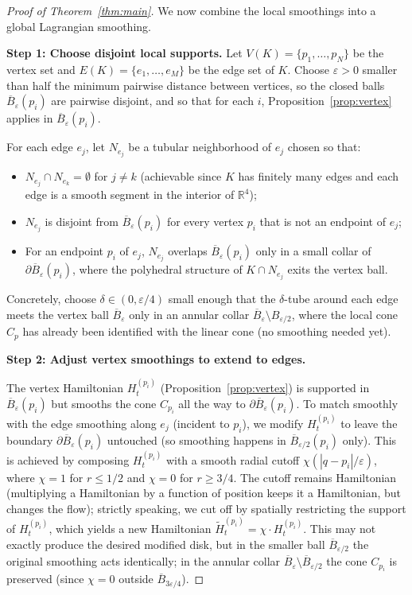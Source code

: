 \documentclass[12pt]{article}
\theoremstyle{definition}
\begin{document}
\begin{proof}[Proof of Theorem~\ref{thm:main}]
We now combine the local smoothings into a global Lagrangian smoothing.

\smallskip\noindent\textbf{Step 1: Choose disjoint local supports.}
Let $V(K)=\{p_1,\dots,p_N\}$ be the vertex set and $E(K)=\{e_1,\dots,e_M\}$ be the edge set of $K$. Choose $\varepsilon>0$ smaller than half the minimum pairwise distance between vertices, so the closed balls $\overline{B}_\varepsilon(p_i)$ are pairwise disjoint, and so that for each $i$, Proposition~\ref{prop:vertex} applies in $\overline{B}_\varepsilon(p_i)$.

For each edge $e_j$, let $N_{e_j}$ be a tubular neighborhood of $e_j$ chosen so that:
\begin{itemize}
\item $N_{e_j}\cap N_{e_k}=\emptyset$ for $j\neq k$ (achievable since $K$ has finitely many edges and each edge is a smooth segment in the interior of $\mathbb{R}^4$);
\item $N_{e_j}$ is disjoint from $\overline{B}_\varepsilon(p_i)$ for every vertex $p_i$ that is not an endpoint of $e_j$;
\item For an endpoint $p_i$ of $e_j$, $N_{e_j}$ overlaps $\overline{B}_\varepsilon(p_i)$ only in a small collar of $\partial\overline{B}_\varepsilon(p_i)$, where the polyhedral structure of $K\cap N_{e_j}$ exits the vertex ball.
\end{itemize}

Concretely, choose $\delta\in(0,\varepsilon/4)$ small enough that the $\delta$-tube around each edge meets the vertex ball $\overline{B}_\varepsilon$ only in an annular collar $\overline{B}_\varepsilon\setminus B_{\varepsilon/2}$, where the local cone $C_p$ has already been identified with the linear cone (no smoothing needed yet).

\smallskip\noindent\textbf{Step 2: Adjust vertex smoothings to extend to edges.}

The vertex Hamiltonian $H_t^{(p_i)}$ (Proposition~\ref{prop:vertex}) is supported in $\overline{B}_\varepsilon(p_i)$ but smooths the cone $C_{p_i}$ all the way to $\partial\overline{B}_\varepsilon(p_i)$. To match smoothly with the edge smoothing along $e_j$ (incident to $p_i$), we modify $H_t^{(p_i)}$ to leave the boundary $\partial\overline{B}_\varepsilon(p_i)$ untouched (so smoothing happens in $\overline{B}_{\varepsilon/2}(p_i)$ only). This is achieved by composing $H_t^{(p_i)}$ with a smooth radial cutoff $\chi(|q-p_i|/\varepsilon)$, where $\chi=1$ for $r\leq 1/2$ and $\chi=0$ for $r\geq 3/4$. The cutoff remains Hamiltonian (multiplying a Hamiltonian by a function of position keeps it a Hamiltonian, but changes the flow); strictly speaking, we cut off by spatially restricting the support of $H_t^{(p_i)}$, which yields a new Hamiltonian $\widetilde H_t^{(p_i)}=\chi\cdot H_t^{(p_i)}$. This may not exactly produce the desired modified disk, but in the smaller ball $\overline{B}_{\varepsilon/2}$ the original smoothing acts identically; in the annular collar $\overline{B}_\varepsilon\setminus\overline{B}_{\varepsilon/2}$ the cone $C_{p_i}$ is preserved (since $\chi=0$ outside $\overline{B}_{3\varepsilon/4}$).


\end{proof}
\end{document}
